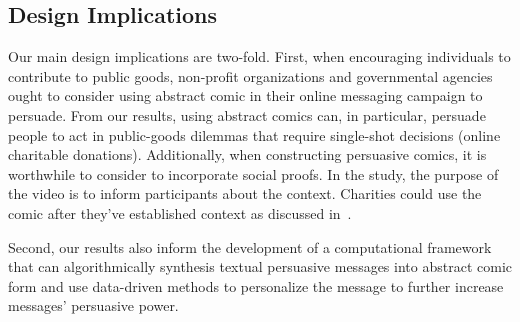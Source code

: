\subsection{Design Implications}
Our main design implications are two-fold. First, when encouraging individuals to contribute to public goods, non-profit organizations and governmental agencies ought to consider using abstract comic in their online messaging campaign to persuade. From our results, using abstract comics can, in particular, persuade people to act in public-goods dilemmas that require single-shot decisions (online charitable donations). Additionally, when constructing persuasive comics, it is worthwhile to consider to incorporate social proofs. In the study, the purpose of the video is to inform participants about the context. Charities could use the comic after they've established context as discussed in~. 

Second, our results also inform the development of a computational framework that can algorithmically synthesis textual persuasive messages into abstract comic form and use data-driven methods to personalize the message to further increase messages' persuasive power. 

